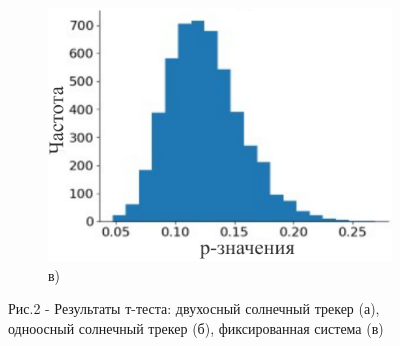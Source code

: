 \begin{figure}[H]
    \par\bigskip

    \begin{subfigure}[b]{0.45\textwidth}
        \centering
        \includegraphics[width=\textwidth]{media/ict/image6}
        \caption*{в)}
    \end{subfigure}
    \caption*{Рис.2 - Результаты т-теста: двухосный солнечный трекер (а), одноосный солнечный трекер (б), фиксированная система (в)}
\end{figure}

